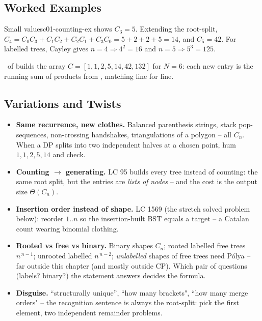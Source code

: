 \subsection{Worked Examples}

\begin{example}{Small values}{c01-counting-ex}
 shows $C_3 = 5$. Extending the root-split,
$C_4 = C_0C_3 + C_1C_2 + C_2C_1 + C_3C_0 = 5 + 2 + 2 + 5 = 14$, and $C_5 = 42$.
For labelled trees, Cayley gives $n = 4 \Rightarrow 4^{2} = 16$ and $n = 5 \Rightarrow 5^{3} = 125$.
\end{example}

\begin{tracebox}
\lstname\ of  builds the array $C = [1, 1, 2, 5, 14, 42, 132]$ for
$N = 6$: each new entry is the running sum of products from ,
matching  line for line.
\end{tracebox}

\subsection{Variations and Twists}

\begin{itemize}
  \item \textbf{Same recurrence, new clothes.} Balanced parenthesis strings, stack
        pop-sequences, non-crossing handshakes, triangulations of a polygon -- all
        $C_n$. When a DP splits into two independent halves at a chosen point, hum
        $1,1,2,5,14$ and check. \hfill{}
  \item \textbf{Counting $\to$ generating.} LC 95 builds every tree instead of counting:
        the same root split, but the entries are \emph{lists of nodes} -- and the cost
        is the output size $\Theta(C_n)$. \hfill{}
  \item \textbf{Insertion order instead of shape.} LC 1569 (the stretch solved problem
        below): reorder $1..n$ so the insertion-built BST equals a target -- a Catalan
        count wearing binomial clothing. \hfill{}
  \item \textbf{Rooted vs free vs binary.} Binary shapes $C_n$; rooted labelled free
        trees $n^{\,n-1}$; unrooted labelled $n^{\,n-2}$; \emph{unlabelled} shapes of
        free trees need P\'olya -- far outside this chapter (and mostly outside CP).
        Which pair of questions (labels? binary?) the statement answers decides the
        formula. \hfill{}
  \item \textbf{Disguise.} ``structurally unique'', ``how many brackets", ``how many
        merge orders" -- the recognition sentence is always the root-split: pick the
        first element, two independent remainder problems.
\end{itemize}

